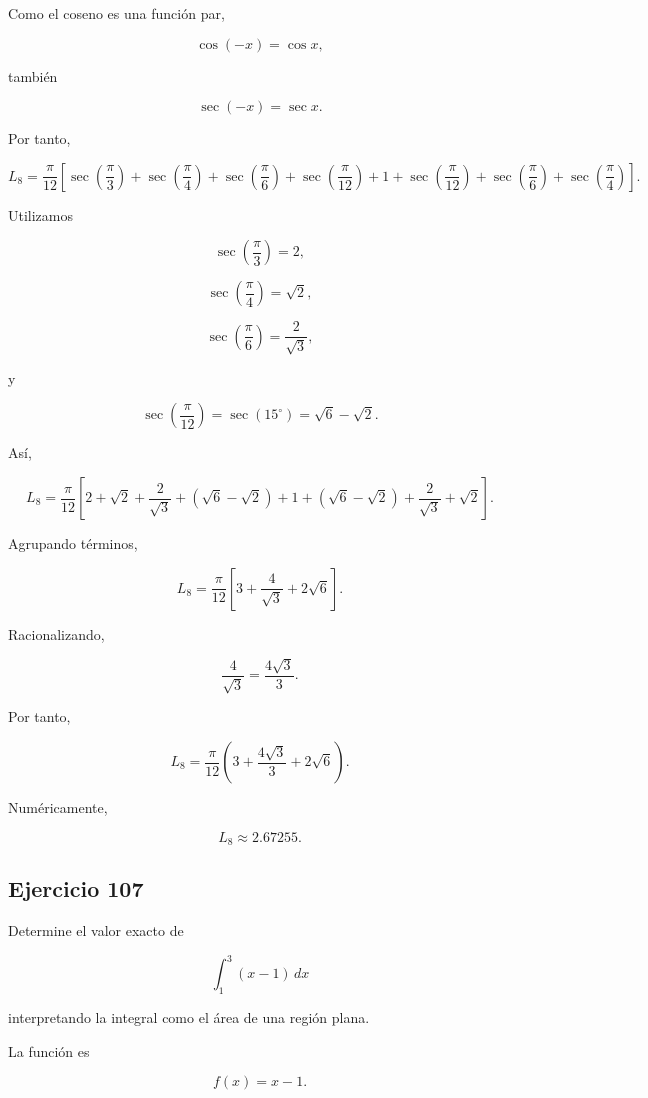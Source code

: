 \documentclass[12pt]{article}
\begin{document}
Como el coseno es una función par,

\[
\cos(-x)=\cos x,
\]

también

\[
\sec(-x)=\sec x.
\]

Por tanto,

\[
L_8
=
\frac{\pi}{12}
\left[
\sec\left(\frac{\pi}{3}\right)
+
\sec\left(\frac{\pi}{4}\right)
+
\sec\left(\frac{\pi}{6}\right)
+
\sec\left(\frac{\pi}{12}\right)
+
1
+
\sec\left(\frac{\pi}{12}\right)
+
\sec\left(\frac{\pi}{6}\right)
+
\sec\left(\frac{\pi}{4}\right)
\right].
\]

Utilizamos

\[
\sec\left(\frac{\pi}{3}\right)=2,
\]

\[
\sec\left(\frac{\pi}{4}\right)=\sqrt{2},
\]

\[
\sec\left(\frac{\pi}{6}\right)
=
\frac{2}{\sqrt3},
\]

y

\[
\sec\left(\frac{\pi}{12}\right)
=
\sec(15^\circ)
=
\sqrt6-\sqrt2.
\]

Así,

\[
L_8
=
\frac{\pi}{12}
\left[
2
+\sqrt2
+\frac{2}{\sqrt3}
+(\sqrt6-\sqrt2)
+1
+(\sqrt6-\sqrt2)
+\frac{2}{\sqrt3}
+\sqrt2
\right].
\]

Agrupando términos,

\[
L_8
=
\frac{\pi}{12}
\left[
3
+\frac{4}{\sqrt3}
+2\sqrt6
\right].
\]

Racionalizando,

\[
\frac4{\sqrt3}
=
\frac{4\sqrt3}{3}.
\]

Por tanto,

\[
\boxed{
L_8
=
\frac{\pi}{12}
\left(
3+\frac{4\sqrt3}{3}+2\sqrt6
\right)
}.
\]

Numéricamente,

\[
\boxed{
L_8\approx 2.67255
}.
\]

\subsection*{Ejercicio 107}

Determine el valor exacto de

\[
\int_{1}^{3}(x-1)\,dx
\]

interpretando la integral como el área de una región plana.

La función es

\[
f(x)=x-1.
\]
\end{document}
